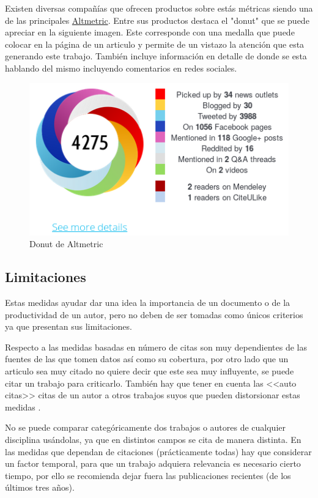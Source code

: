 Existen diversas compañías que ofrecen productos sobre estás métricas siendo una de las principales \href{https://www.altmetric.com/}{Altmetric}. Entre sus productos destaca el "donut" que se puede apreciar en la siguiente imagen. Este corresponde con una medalla que puede colocar en la página de un articulo y permite de un vistazo la atención que esta generando este trabajo. También incluye información en detalle de donde se esta hablando del mismo incluyendo comentarios en redes sociales.

\begin{figure}[h]
	
	\centering
	\includegraphics[width=0.7\linewidth]{imagenes/altmetrics_donough}
	\caption{Donut de Altmetric}
	\label{fig:altmetricsdonough}
\end{figure}


\subsection{Limitaciones}
Estas medidas ayudar dar una idea la importancia de un documento o de la productividad de un autor, pero no deben de ser tomadas como únicos criterios ya que presentan sus limitaciones.

Respecto a las medidas basadas en número de citas son muy dependientes de las fuentes de las que tomen datos así como su cobertura, por otro lado que un articulo sea muy citado no quiere decir que este sea muy influyente, se puede citar un trabajo para criticarlo. También hay que tener en cuenta las <<auto citas>> citas de un autor a otros trabajos suyos que pueden distorsionar estas medidas \cite{BibliometricWhitePaper}.

No se puede comparar categóricamente dos trabajos o autores de cualquier disciplina usándolas, ya que en distintos campos se cita de manera distinta. En las medidas que dependan de citaciones (prácticamente todas) hay que considerar un factor temporal, para que un trabajo adquiera relevancia es necesario cierto tiempo, por ello se recomienda dejar fuera las publicaciones recientes (de los últimos tres años)\cite{BibliometricWhitePaper}.


